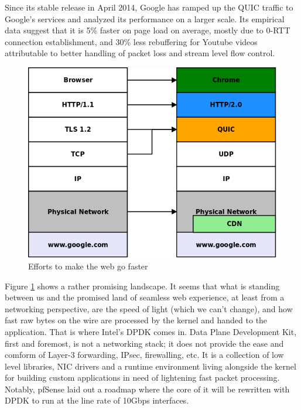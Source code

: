 \documentclass{sig-alternate-05-2015}
\begin{document}
Since its stable release in April 2014, Google has ramped up the QUIC traffic to Google's services and analyzed its performance on a larger scale. Its empirical data suggest that it is 5\% faster on page load on average, mostly due to 0-RTT connection establishment, and 30\% less rebuffering for Youtube videos attributable to better handling of packet loss and stream level flow control.\cite{quic:presentation}

\begin{figure}[bh]
\centering
\includegraphics[scale=0.27]{web.png}
\caption{Efforts to make the web go faster}
\label{fig:webstack}
\end{figure}

Figure \ref{fig:webstack} shows a rather promising landscape. It seems that what is standing between us and the promised land of seamless web experience, at least from a networking perspective, are the speed of light (which we can't change), and how fast raw bytes on the wire are processed by the kernel and handed to the application. That is where Intel's DPDK comes in. Data Plane Development Kit, first and foremost, is not a networking stack; it does not provide the ease and comform of Layer-3 forwarding, IPsec, firewalling, etc. It is a collection of low level libraries, NIC drivers and a runtime environment living alongside the kernel for building custom applications in need of lightening fast packet processing.\cite{dpdk:home} Notably, pfSense laid out a roadmap where the core of it will be rewritten with DPDK to run at the line rate of 10Gbps interfaces. \cite{pfsense:roadmap}
\end{document}
